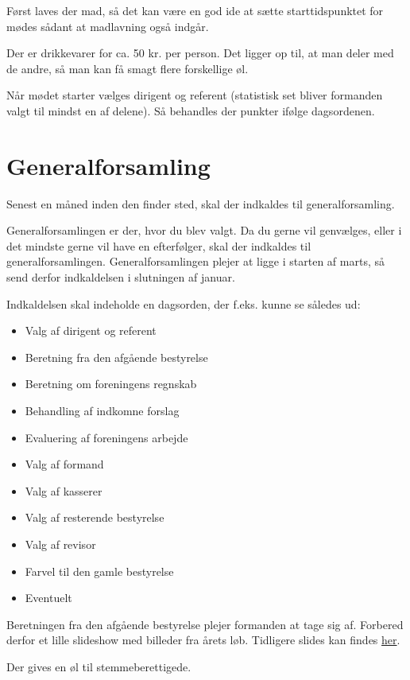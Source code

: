 Først laves der mad, så det kan være en god ide at sætte starttidspunktet for
mødes sådant at madlavning også indgår. 

Der er drikkevarer for ca. 50 kr. per person. 
Det ligger op til, at man deler med de andre, så man kan få smagt flere forskellige øl.

Når mødet starter vælges dirigent og referent (statistisk set bliver
formanden valgt til mindst en af delene). Så behandles der punkter
ifølge dagsordenen.

\section{Generalforsamling}
\label{sec:generalforsamling}

Senest en måned inden den finder sted, skal der indkaldes til generalforsamling.

Generalforsamlingen er der, hvor du blev valgt. Da du gerne vil
genvælges, eller i det mindste gerne vil have en efterfølger, skal der
indkaldes til generalforsamlingen. Generalforsamlingen plejer at ligge
i starten af marts, så send derfor indkaldelsen i slutningen af januar.

Indkaldelsen skal indeholde en dagsorden, der f.eks. kunne se således ud:
\begin{itemize}
    \item Valg af dirigent og referent
    \item Beretning fra den afgående bestyrelse
    \item Beretning om foreningens regnskab
    \item Behandling af indkomne forslag
    \item Evaluering af foreningens arbejde
    \item Valg af formand
    \item Valg af kasserer
    \item Valg af resterende bestyrelse
    \item Valg af revisor
    \item Farvel til den gamle bestyrelse
    \item Eventuelt
\end{itemize}

Beretningen fra den afgående bestyrelse plejer formanden at tage sig
af. Forbered derfor et lille slideshow med billeder fra årets løb.
Tidligere slides kan findes \href{https://gitlab.au.dk/fredagscafeen/slides}{her}.

Der gives en øl til stemmeberettigede.

